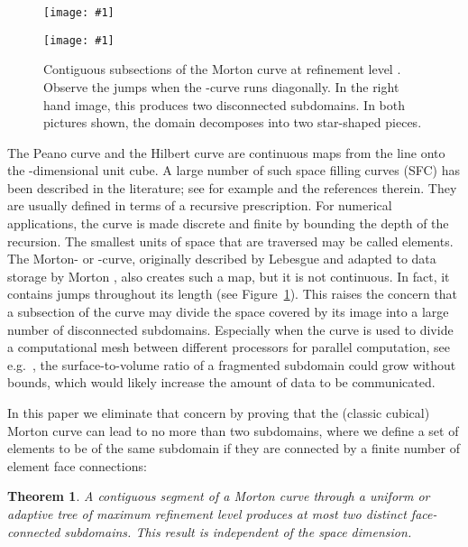 \documentclass[a4paper,11pt]{article}
\newcommand{\inputtikz}[1]{\texttt{[image: \#1]}}
\newcommand{\figlab}[1]{\label{fig:#1}}
\newcommand{\figref}[1]{Figure~\ref{fig:#1}}
\newtheorem{thm}{Theorem}
\begin{document}
\begin{figure}\centering
\begin{minipage}{0.49\textwidth}\centering
    \inputtikz{morton1}
  \end{minipage}
  \begin{minipage}{0.49\textwidth}\centering
    \inputtikz{morton2}
  \end{minipage}
  \caption{Contiguous subsections of the Morton curve at refinement
           level .  Observe the jumps when the -curve
           runs diagonally.  In the right hand image, this
           produces two disconnected subdomains.
           In both pictures shown, the domain decomposes into two star-shaped
           pieces.}
  \figlab{morton}
\end{figure}
The Peano curve \cite{Peano90} and the Hilbert curve \cite{Hilbert91} are
continuous maps from the line onto the -dimensional unit cube.  A large
number of such space filling curves (SFC) has been described in the literature; see
for example \cite{Sagan94, Bader12, HaverkortWalderveen10} and the references
therein.  They are usually defined in terms of a recursive prescription.  For
numerical applications, the curve is made discrete and finite by bounding the
depth of the recursion.  The smallest units of space that are traversed may be
called elements.  The Morton- or -curve, originally described by Lebesgue
\cite{Lebesgue04} and adapted to data storage by Morton \cite{Morton66}, also
creates such a map, but it is not continuous.  In fact, it contains jumps
throughout its length (see \figref{morton}).  This raises the concern that a
subsection of the curve may divide the space covered by its image into a large
number of disconnected subdomains.  Especially when the curve is used to divide
a computational mesh between different processors for parallel computation, see
e.g.\ \cite{GriebelZumbusch99, AkcelikBielakBirosEtAl03,
BursteddeGhattasGurnisEtAl10, AhimianLashukVeerapaneniEtAl10,
WeinzierlMehl11},
the surface-to-volume ratio of a fragmented subdomain could grow without
bounds, which would likely increase the amount of data to be communicated.

In this paper we eliminate that concern by proving that the (classic cubical)
Morton curve can lead to no more than two subdomains, where we define a set of
elements to be of the same subdomain if they are connected by a finite number
of element face connections:
\begin{thm}
  \label{illthmallcube}
  A contiguous segment of a Morton curve through a uniform or adaptive tree
  of maximum refinement level  produces at most two distinct face-connected
  subdomains.
  This result is independent of the space dimension.
\end{thm}
\end{document}
